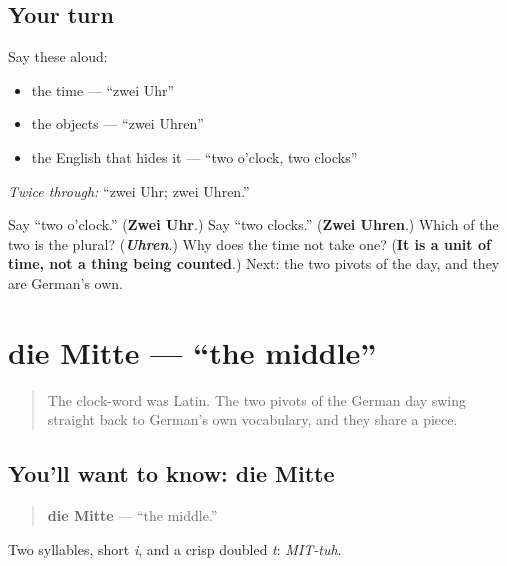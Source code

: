 \subsection*{Your turn}
Say these aloud:

\begin{itemize}
\raggedright
  \item the time — \textquotedblleft{}zwei Uhr\textquotedblright{}
  \item the objects — \textquotedblleft{}zwei Uhren\textquotedblright{}
  \item the English that hides it — \textquotedblleft{}two o'clock, two clocks\textquotedblright{}
\end{itemize}

\emph{Twice through:} \textquotedblleft{}zwei Uhr; zwei Uhren.\textquotedblright{}

\begin{tcolorbox}[breakable,colback=teal!4,colframe=teal!35!black,title={Before you move on}]
Say \textquotedblleft{}two o'clock.\textquotedblright{} (\textbf{Zwei Uhr}.) Say \textquotedblleft{}two clocks.\textquotedblright{} (\textbf{Zwei Uhren}.) Which of the two is the plural? (\emph{\textbf{Uhren}}.) Why does the time not take one? (\textbf{It is a unit of time, not a thing being counted}.) Next: the two pivots of the day, and they are German's own.
\end{tcolorbox}
\section[die Mitte]{die Mitte — \textquotedblleft{}the middle\textquotedblright{}}

\label{lesson:GE-C08-mitte}



\begin{quote}
The clock-word was Latin. The two pivots of the German day swing straight back to German's own vocabulary, and they share a piece.
\end{quote}

\subsection*{You'll want to know: die Mitte}
\begin{quote}
\textbf{die Mitte} — \textquotedblleft{}the middle.\textquotedblright{}
\end{quote}

Two syllables, short \emph{i}, and a crisp doubled \emph{t}: \emph{MIT-tuh}.

